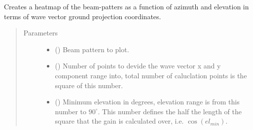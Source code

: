 \documentclass[letterpaper,10pt,english]{sphinxmanual}
\begin{document}
\begin{fulllineitems}
\label{\detokenize{modules/antenna:antenna.plot_gain_heatmap}}
Creates a heatmap of the beam-patters as a function of azimuth and elevation in terms of wave vector ground projection coordinates.
\begin{quote}\begin{description}
\item[{Parameters}] \leavevmode\begin{itemize}
\item {} 
 ({\hyperref[\detokenize{modules/antenna:antenna.BeamPattern}]{}}) \textendash{} Beam pattern to plot.

\item {} 
 () \textendash{} Number of points to devide the wave vector x and y component range into, total number of caluclation points is the square of this number.

\item {} 
 () \textendash{} Minimum elevation in degrees, elevation range is from this number to \(90^\circ\). This number defines the half the length of the square that the gain is calculated over, i.e. \(\cos(el_{min})\).

\end{itemize}

\end{description}\end{quote}

\end{fulllineitems}

\end{document}
